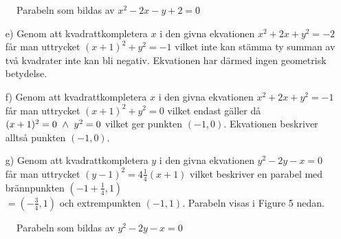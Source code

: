 \documentclass{article}
\begin{document}
\newpage

\begin{figure}[h]
    \center
    \caption{\footnotesize Parabeln som bildas av $x^2-2x-y+2=0$}
\end{figure}

\begin{enumerate}
    \item[e)] Genom att kvadrattkompletera $x$ i den givna ekvationen $x^2+2x+y^2=-2$ får man uttrycket $(x+1)^2+y^2=-1$ vilket inte kan stämma ty summan av två kvadrater inte kan bli negativ. Ekvationen har därmed ingen geometrisk betydelse.
\end{enumerate}

\begin{enumerate}
    \item[f)] Genom att kvadrattkompletera $x$ i den givna ekvationen $x^2+2x+y^2=-1$ får man uttrycket $(x+1)^2+y^2=0$ vilket endast gäller då $(x+1)^2=0 \ \wedge \  y^2=0$ vilket ger punkten $(-1, 0)$. Ekvationen beskriver alltså punkten $(-1, 0)$.
\end{enumerate}

\begin{enumerate}
    \item[g)] Genom att kvadrattkompletera $y$ i den givna ekvationen $y^2-2y-x=0$ får man uttrycket $(y-1)^2=4\frac{1}{4}(x+1)$ vilket beskriver en parabel med brännpunkten $(-1+\frac{1}{4}, 1)$ \\ $=(-\frac{3}{4}, 1)$ och extrempunkten $(-1, 1)$. Parabeln visas i Figure 5 nedan.
\end{enumerate}

\begin{figure}[h]
    \center
    \caption{\footnotesize Parabeln som bildas av $y^2-2y-x=0$}
\end{figure}
\end{document}

